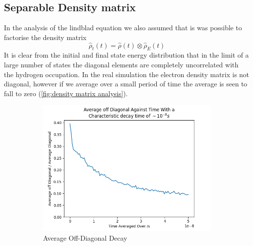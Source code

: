 \subsection{Separable Density matrix}
In the analysis of the lindblad
equation we also assumed that is was possible
to factorise the density
matrix
\begin{equation}
    \hat{\rho}_t(t) = \hat{\rho}(t) \otimes \hat{\rho}_E(t)
\end{equation}
It is clear from the
initial and final
state energy distribution that
in the limit of a large
number of states the
diagonal elements are completely
uncorrelated with the
hydrogen occupation.
In the real simulation
the electron density
matrix is not diagonal,
however if we average
over a small period of time
the average is seen to
fall to zero
(\cref{fig:density matrix analysis}).
\begin{figure}[htbp]
    \centering
    \begin{subfigure}{0.45\linewidth}
        \centering
        \includegraphics[width =0.9 \linewidth]{Figures/Discussion/Off Diagonal Average Matrix Element Decay.png}
        \caption{Average Off-Diagonal Decay
        }\label{sub@fig:off diagonal matrix decay}
    \end{subfigure}
    \hfill
    \begin{subfigure}{0.45\linewidth}
        \centering

\end{subfigure}
\end{figure}

